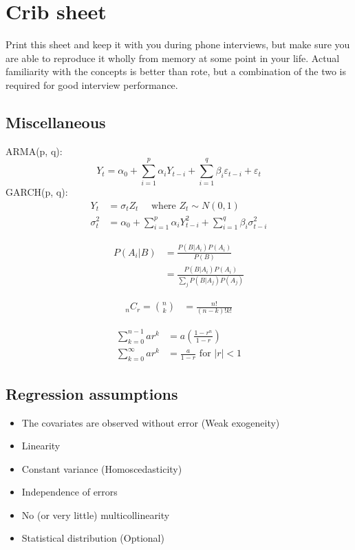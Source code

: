 \documentclass[a4paper]{article}
\begin{document}
\clearpage
\section{Crib sheet}
\label{ap:cribsheet}
Print this sheet and keep it with you during phone interviews, but make sure you are able to reproduce it wholly from memory at some point in your life.
Actual familiarity with the concepts is better than rote, but a combination of the two is required for good interview performance.


\begin{multicols}{2}

\subsection*{Miscellaneous}
ARMA(p, q):
\[
 Y_t = \alpha_0 +
  \sum_{i=1}^{p}{ \alpha_i Y_{t-i} }
  +
  \sum_{i=1}^{q}{ \beta_i \varepsilon_{t-i} }
  +
  \varepsilon_{t}
\]
\noindent
GARCH(p, q):
\begin{align*}
 Y_t &= \sigma_t Z_t  \quad \text{ where } Z_t \sim N(0,1) \\
 \sigma^2_{t}
 &=
 \alpha_0 +
  \sum_{i=1}^{p}{ \alpha_i Y^2_{t-i} }
  +
  \sum_{i=1}^{q}{ \beta_i \sigma^2_{t-i} }
\end{align*}


\begin{align*}
P(A_i|B)
&= \frac {P(B|A_i)P(A_i)} {P(B)} \\
&= \frac {P(B|A_i)P(A_i)} { \sum_{j} P(B|A_j)P(A_j) }
\end{align*}

\begin{align*}
{}_nC_{r} =
\binom{n}{k} &= \frac{n!}{ (n-k)! k! }
\end{align*}

\begin{align*}
  \sum_{k=0}^{n-1} {ar^k}    &= a \left(\frac{1-r^n}{1-r}\right) \\
  \sum_{k=0}^{\infty} {ar^k} &= \frac{a}{1-r} \text{ for } |r|<1
\end{align*}

\subsection*{Regression assumptions}

\begin{itemize}[itemsep=-2pt, topsep=2pt, partopsep=0pt]
  \small
  \item The covariates are observed without error (Weak exogeneity)
  \item Linearity
  \item Constant variance (Homoscedasticity)
  \item Independence of errors
  \item No (or very little) multicollinearity
  \item Statistical distribution (Optional)
\end{itemize}


\end{multicols}
\end{document}
